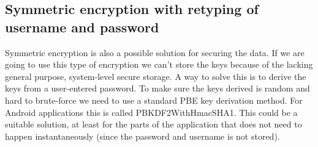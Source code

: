 \subsection{Symmetric encryption with retyping of username and password}
Symmetric encryption is also a possible solution for securing the data. If we are going to use this type of encryption we can’t store the keys because of the lacking general purpose, system-level secure storage.
\newline
\newline
A way to solve this is to derive the keys from a user-entered password. To make sure the keys derived is random and hard to brute-force we need to use a standard PBE key derivation method. For Android applications this is called PBKDF2WithHmacSHA1.
\newline
\newline
This could be a suitable solution, at least for the parts of the application that does not need to happen instantaneously (since the password and username is not stored).

